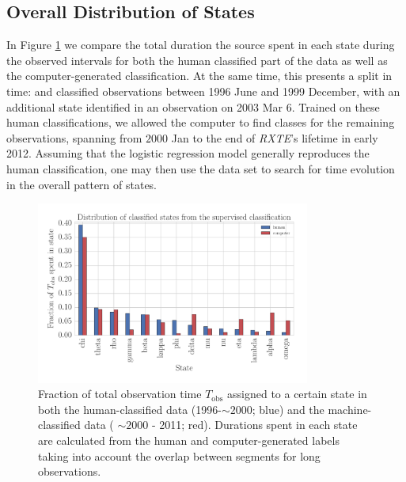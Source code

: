 \documentclass[12pt]{emulateapj}
\newcommand{\project}[1]{\textsl{#1}}
\newcommand{\rxte}{\project{RXTE}}
\begin{document}
\subsection{Overall Distribution of States}

In Figure \ref{fig:state_durations} we compare the total duration the source spent in each state during the observed intervals for both the human classified part of the data as well as the computer-generated classification. At the same time, this presents a split in time: \citet{belloni2000} and \citet{kleinwolt2002} classified observations between 1996 June and 1999 December, with an additional state identified in an observation on 2003 Mar 6. Trained on these human classifications,
we allowed the computer to find classes for the remaining observations, spanning from $2000$ Jan to the end of \rxte's lifetime in early 2012. 
Assuming that the logistic regression model generally reproduces the human classification, one may then use the data set to search for time evolution in the overall pattern of states. 

\begin{figure}[htbp]
\begin{center}
\includegraphics[width=9cm]{grs1915_supervised_states_histogram.pdf}
\caption{Fraction of total observation time $T_\mathrm{obs}$ assigned to a certain state in both the human-classified data (1996-$\sim\!\! 2000$; blue) and the machine-classified data ( $\sim\!\! 2000$ - 2011; red). Durations spent in each state are calculated from the human and computer-generated labels taking into 
account the overlap between segments for long observations.} 
\label{fig:state_durations}
\end{center}
\end{figure}
\end{document}
